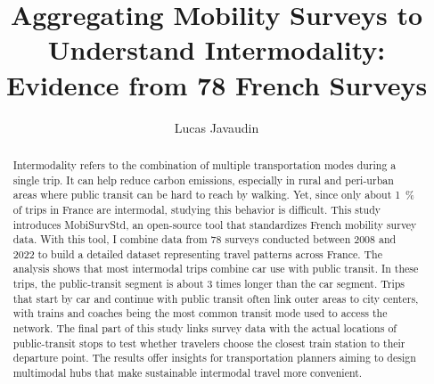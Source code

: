 \documentclass[3p,times,procedia]{elsarticle}
\begin{document}
\begin{frontmatter}



%

\title{Aggregating Mobility Surveys to Understand Intermodality: Evidence from 78 French Surveys}




\author[cyu,lvmt]{Lucas Javaudin}

\address[cyu]{THEMA, CY Cergy Paris Université, 33 Boulevard du Port, 95000 Cergy, France}
\address[lvmt]{LVMT, ENPC, Institut Polytechnique de Paris, Univ Gustave Eiffel, 6-8 Avenue Blaise Pascal, 77420 Champs-sur-Marne, France}

\begin{abstract}
    Intermodality refers to the combination of multiple transportation modes during a single trip.
    It can help reduce carbon emissions, especially in rural and peri-urban areas where public transit can be hard to reach by walking.
    Yet, since only about \SI{1}{\%} of trips in France are intermodal, studying this behavior is difficult.
    This study introduces MobiSurvStd, an open-source tool that standardizes French mobility survey data.
    With this tool, I combine data from 78 surveys conducted between 2008 and 2022 to build a detailed dataset representing travel patterns across France.
    The analysis shows that most intermodal trips combine car use with public transit.
    In these trips, the public-transit segment is about 3 times longer than the car segment.
    Trips that start by car and continue with public transit often link outer areas to city centers, with trains and coaches being the most common transit mode used to access the network.
    The final part of this study links survey data with the actual locations of public-transit stops to test whether travelers choose the closest train station to their departure point.
    The results offer insights for transportation planners aiming to design multimodal hubs that make sustainable intermodal travel more convenient.
\end{abstract}


\end{frontmatter}
\end{document}
